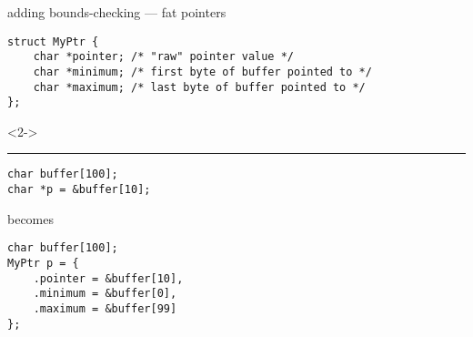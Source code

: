 

\begin{frame}[fragile,label=wrappedPointers]{adding bounds-checking --- fat pointers}
\lstset{
    language=C,
    style=small
}
\begin{lstlisting}
struct MyPtr {
    char *pointer; /* "raw" pointer value */
    char *minimum; /* first byte of buffer pointed to */
    char *maximum; /* last byte of buffer pointed to */
};
\end{lstlisting}
\begin{visibleenv}<2->
\hrule
\begin{lstlisting}
char buffer[100];
char *p = &buffer[10];
\end{lstlisting}
becomes
\begin{lstlisting}
char buffer[100];
MyPtr p = {
    .pointer = &buffer[10],
    .minimum = &buffer[0],
    .maximum = &buffer[99]
};
\end{lstlisting}
\end{visibleenv}
\end{frame}

